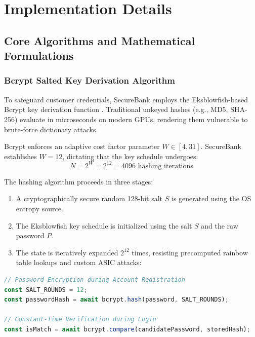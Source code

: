 \chapter{Implementation Details}

\section{Core Algorithms and Mathematical Formulations}

\subsection{Bcrypt Salted Key Derivation Algorithm}
To safeguard customer credentials, SecureBank employs the Eksblowfish-based Bcrypt key derivation function \cite{provos1999bcrypt}. Traditional unkeyed hashes (e.g., MD5, SHA-256) evaluate in microseconds on modern GPUs, rendering them vulnerable to brute-force dictionary attacks.

Bcrypt enforces an adaptive cost factor parameter $W \in [4, 31]$. SecureBank establishes $W = 12$, dictating that the key schedule undergoes:
\begin{equation}
N = 2^W = 2^{12} = 4096 \text{ hashing iterations}
\end{equation}

The hashing algorithm proceeds in three stages:
\begin{enumerate}
    \item A cryptographically secure random 128-bit salt $S$ is generated using the OS entropy source.
    \item The Eksblowfish key schedule is initialized using the salt $S$ and the raw password $P$.
    \item The state is iteratively expanded $2^{12}$ times, resisting precomputed rainbow table lookups and custom ASIC attacks:
\end{enumerate}

\begin{lstlisting}[language=JavaScript, caption={Bcrypt Hash Generation Implementation}]
// Password Encryption during Account Registration
const SALT_ROUNDS = 12;
const passwordHash = await bcrypt.hash(password, SALT_ROUNDS);

// Constant-Time Verification during Login
const isMatch = await bcrypt.compare(candidatePassword, storedHash);
\end{lstlisting}

